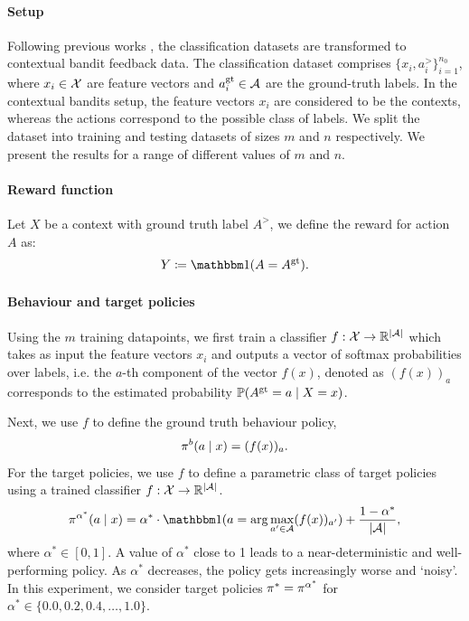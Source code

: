 \paragraph{Setup}
Following previous works \citep{dudik2014doubly, kallus2021optimal, mehrdad2018more,wang2017optimal}, the classification datasets are transformed to contextual bandit feedback data. The classification dataset comprises $\{x_i, a^\gt_i\}_{i=1}^{n_0}$, where $x_i\in \mathcal{X}$ are feature vectors and $a^{\textup{gt}}_i\in \mathcal{A}$ are the ground-truth labels. In the contextual bandits setup, the feature vectors $x_i$ are considered to be the contexts, whereas the actions correspond to the possible class of labels. We split the dataset into training and testing datasets of sizes $m$ and $n$ respectively. We present the results for a range of different values of $m$ and $n$.

\paragraph{Reward function}
Let $X$ be a context with ground truth label $A^\gt$, we define the reward for action $A$ as:
\[
Y \coloneqq \ind(A = A^\gt).
\]

\paragraph{Behaviour and target policies}
Using the $m$ training datapoints, we first train a classifier $f: \mathcal{X}\rightarrow \mathbb{R}^{|\mathcal{A}|}$ which takes as input the feature vectors $x_i$ and outputs a vector of softmax probabilities over labels, i.e. the $a$-th component of the vector $f(x)$, denoted as $(f(x))_{a}$ corresponds to the estimated probability $\mathbb{P}(A^{{\textup{gt}}} = a \mid X=x)$.

Next, we use $f$ to define the ground truth behaviour policy, 
\[
\pi^b(a\mid x) = (f(x))_{a}.
\]
For the target policies, we use $f$ to define a parametric class of target policies using a trained classifier $f: \mathcal{X}\rightarrow \mathbb{R}^{|\mathcal{A}|}$. 
\[
\pi^{\alpha^\ast}(a\mid x) =\alpha^\ast\cdot \ind(a= \arg\max_{a' \in \Aspace} (f(x))_{a'}) +  \frac{1-\alpha^\ast}{|\Aspace|},
\]
where $\alpha^\ast \in [0, 1]$. A value of $\alpha^\ast$ close to 1 leads to a near-deterministic and well-performing policy. As $\alpha^\ast$ decreases, the policy gets increasingly worse and `noisy'. In this experiment, we consider target policies $\pi^* = \pi^{\alpha^\ast}$ for $\alpha^\ast \in \{0.0, 0.2, 0.4, \dots, 1.0\}$. 

